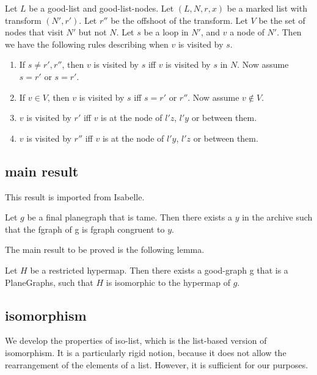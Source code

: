 \begin{lemma}\guid{}
Let $L$ be a good-list and good-list-nodes.
Let $(L,N,r,x)$ be a marked list with transform $(N',r')$.  Let $r''$ be the offshoot of the transform.
Let $V$ be the set of nodes that visit $N'$ but not $N$.
Let $s$ be a loop in $N'$, and $v$ a node of $N'$.  Then we have the following
rules describing when $v$ is visited by $s$.
\begin{enumerate}
\item If $s\ne r',r''$, then $v$ is visited by $s$ iff $v$ is visited by $s$ in $N$.  Now assume $s=r'$ or $s=r'$.
\item If $v\in V$, then $v$ is visited by $s$ iff $s = r'$ or $r''$.  Now assume $v\not\in V$.
\item $v$ is visited by $r'$ iff $v$ is at the node of $l'z$, $l'y$ or between them.
\item $v$ is visited by $r''$ iff $v$ is at the node of $l'y$, $l'z$ or between them.
\end{enumerate}
\end{lemma}


\subsection{main result}

This result is imported from Isabelle.

\begin{theorem}  Let $g$ be a final
planegraph that is tame.  Then there exists a $y$ in the archive such
that the fgraph of g is fgraph congruent to $y$.
\end{theorem}

The main result to be proved is the following lemma.

\begin{lemma}[LSKOKJE]  Let $H$ be a restricted hypermap.  Then there exists a good-graph g that is a PlaneGraphs,
such that $H$ is isomorphic to the hypermap of $g$.
\end{lemma}

\subsection{isomorphism}


We develop the properties of iso-list, which is the list-based version of isomorphism.
It is a particularly rigid notion, because it does not allow the rearrangement of the elements of a list.
However, it is sufficient for our purposes.

